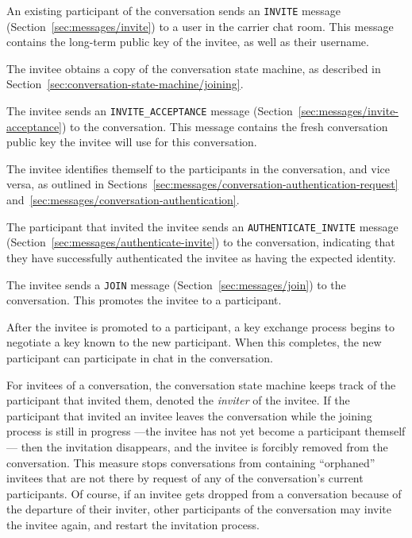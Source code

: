 \documentclass{article}
\def\message#1{\texttt{#1}}
\begin{document}
\begin{description}[noitemsep]
\item[Step 1.] An existing participant of the conversation sends an \message{INVITE} message (Section~\ref{sec:messages/invite}) to a user in the carrier chat room. This message contains the long-term public key of the invitee, as well as their username.
\item[Step 2.] The invitee obtains a copy of the conversation state machine, as described in Section~\ref{sec:conversation-state-machine/joining}.
\item[Step 3.] The invitee sends an \message{INVITE\_ACCEPTANCE} message (Section~\ref{sec:messages/invite-acceptance}) to the conversation. This message contains the fresh conversation public key the invitee will use for this conversation.
\item[Step 4.] The invitee identifies themself to the participants in the conversation, and vice versa, as outlined in Sections~\ref{sec:messages/conversation-authentication-request} and~\ref{sec:messages/conversation-authentication}.
\item[Step 5.] The participant that invited the invitee sends an \message{AUTHENTICATE\_INVITE} message (Section~\ref{sec:messages/authenticate-invite}) to the conversation, indicating that they have successfully authenticated the invitee as having the expected identity.
\item[Step 6.] The invitee sends a \message{JOIN} message (Section~\ref{sec:messages/join}) to the conversation. This promotes the invitee to a participant.
\item[Aftermath.] After the invitee is promoted to a participant, a key exchange process begins to negotiate a key known to the new participant. When this completes, the new participant can participate in chat in the conversation.
\end{description}

For invitees of a conversation, the conversation state machine keeps track of the participant that invited them, denoted the \emph{inviter} of the invitee.
If the participant that invited an invitee leaves the conversation while the joining process is still in progress ---the invitee has not yet become a participant themself--- then the invitation disappears, and the invitee is forcibly removed from the conversation.
This measure stops conversations from containing ``orphaned'' invitees that are not there by request of any of the conversation's current participants.
Of course, if an invitee gets dropped from a conversation because of the departure of their inviter, other participants of the conversation may invite the invitee again, and restart the invitation process.
\end{document}
